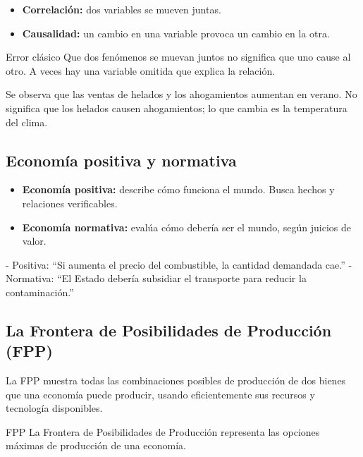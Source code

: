 \begin{itemize}
    \item \textbf{Correlación:} dos variables se mueven juntas.
    \item \textbf{Causalidad:} un cambio en una variable provoca un cambio en la otra.
\end{itemize}

\begin{advertencia}{Error clásico}
Que dos fenómenos se muevan juntos no significa que uno cause al otro. A veces hay una variable omitida que explica la relación.
\end{advertencia}

\begin{ejemplo}
Se observa que las ventas de helados y los ahogamientos aumentan en verano. No significa que los helados causen ahogamientos; lo que cambia es la temperatura del clima.
\end{ejemplo}

\subsection{Economía positiva y normativa}

\begin{itemize}
    \item \textbf{Economía positiva:} describe cómo funciona el mundo. Busca hechos y relaciones verificables.
    \item \textbf{Economía normativa:} evalúa cómo debería ser el mundo, según juicios de valor.
\end{itemize}

\begin{ejemplo}
- Positiva: “Si aumenta el precio del combustible, la cantidad demandada cae.”
- Normativa: “El Estado debería subsidiar el transporte para reducir la contaminación.”
\end{ejemplo}

\subsection{La Frontera de Posibilidades de Producción (FPP)}

La FPP muestra todas las combinaciones posibles de producción de dos bienes que una economía puede producir, usando eficientemente sus recursos y tecnología disponibles.

\begin{concepto}{FPP}
La Frontera de Posibilidades de Producción representa las opciones máximas de producción de una economía.
\end{concepto}

